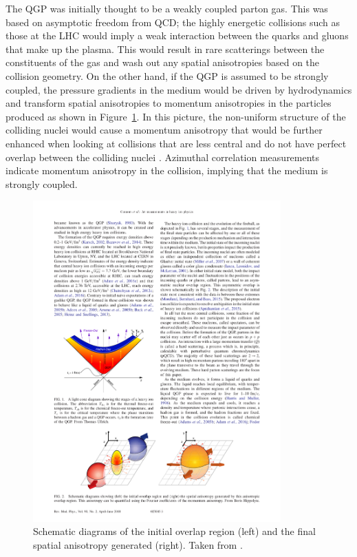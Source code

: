 The QGP was initially thought to be a weakly coupled parton gas. This was based on asymptotic freedom from QCD; the highly energetic collisions such as those at the LHC would imply a weak interaction between the quarks and gluons that make up the plasma. This would result in rare scatterings between the constituents of the gas and wash out any spatial anisotropies based on the collision geometry. On the other hand, if the QGP is assumed to be strongly coupled, the pressure gradients in the medium would be driven by hydrodynamics and transform spatial anisotropies to momentum anisotropies in the particles produced as shown in Figure~\ref{fig:overlap}. In this picture, the non-uniform structure of the colliding nuclei would cause a momentum anisotropy that would be further enhanced when looking at collisions that are less central and do not have perfect overlap between the colliding nuclei \cite{116, 117, 118, 63}. Azimuthal correlation measurements \cite{Aad2014, PhysRevLett.87.182301, PhysRevLett.91.182301, PhysRevLett.98.242302,PhysRevC.89.044906,PhysRevLett.116.132302} indicate momentum anisotropy in the collision, implying that the medium is strongly coupled. 


\begin{figure}[htbp]
\begin{center}
\includegraphics[width=0.85\textwidth]{figures/theory/overlap}
\caption{Schematic diagrams of the initial overlap region (left) and the final spatial anisotropy generated (right). Taken from \cite{RevModPhys.90.025005}.}
\label{fig:overlap}
\end{center}
\end{figure}

